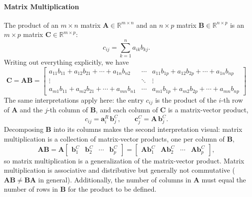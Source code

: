 \paragraph*{Matrix Multiplication}
The product of an $ m \times n $ matrix $ \mathbf{A}\in\mathbb{R}^{m\times n} $ and an $ n \times p $ matrix $ \mathbf{B} \in\mathbb{R}^{n\times p}$ is an $ m \times p $ matrix $ \mathbf{C} \in\mathbb{R}^{m\times p}$:
\begin{equation*}
  c_{ij} = \sum_{k=1}^n a_{ik} b_{kj}.
\end{equation*}
Writing out everything explicitly, we have
\begin{equation*}
  \mathbf{C} = \mathbf{A}\mathbf{B} = \begin{bmatrix}
    a_{11}b_{11} + a_{12}b_{21} +  \cdots + a_{1n}b_{n2} & \cdots & a_{11}b_{1p} + a_{12}b_{2p} + \cdots + a_{1n}b_{np} \\
    \vdots & \ddots & \vdots \\
    a_{m1}b_{11} + a_{m2}b_{21} + \cdots + a_{mn}b_{n1} & \cdots & a_{m1}b_{1p} + a_{m2}b_{2p} + \cdots + a_{mn}b_{np}
  \end{bmatrix}
\end{equation*}
The same interpretations apply here: the entry $ c_{ij} $ is the product of the $ i $-th row of $ \mathbf{A} $ and the $ j $-th column of $ \mathbf{B} $, and each column of $ \mathbf{C} $ is a matrix-vector product,
\begin{equation*}
  c_{ij} = \mathbf{a}^R_i\, \mathbf{b}^C_j,
  \qquad
  \mathbf{c}^C_j = \mathbf{A}\, \mathbf{b}^C_j.
\end{equation*}
Decomposing $\mathbf{B}$ into its columns makes the second interpretation visual: matrix multiplication is a collection of matrix-vector products, one per column of $\mathbf{B}$,
\begin{equation*}
  \mathbf{A}\mathbf{B}
  = \mathbf{A} \begin{bmatrix} \mathbf{b}^C_1 & \mathbf{b}^C_2 & \cdots & \mathbf{b}^C_p \end{bmatrix}
  = \begin{bmatrix} \mathbf{A}\mathbf{b}^C_1 & \mathbf{A}\mathbf{b}^C_2 & \cdots & \mathbf{A}\mathbf{b}^C_p \end{bmatrix},
\end{equation*}
so matrix multiplication is a generalization of the matrix-vector product.
Matrix multiplication is associative and distributive but generally not commutative ($ \mathbf{A}\mathbf{B} \neq \mathbf{B}\mathbf{A} $ in general). Additionally, the number of columns in $ \mathbf{A} $ must equal the number of rows in $ \mathbf{B} $ for the product to be defined.

